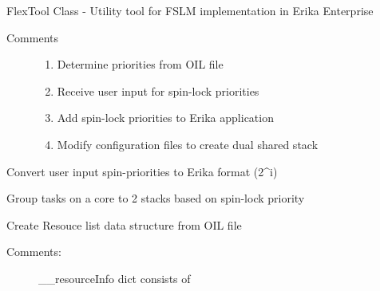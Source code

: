\documentclass[letterpaper,10pt,english]{sphinxmanual}
\begin{document}
\begin{fulllineitems}
\label{\detokenize{code:FlexTool.FlexTool}}
FlexTool Class - Utility tool for FSLM implementation in Erika Enterprise
\begin{description}
\item[{Comments}] \leavevmode{[}{]}\begin{enumerate}
\item {} 
Determine priorities from OIL file

\item {} 
Receive user input for spin-lock priorities

\item {} 
Add spin-lock priorities to Erika application

\item {} 
Modify configuration files to create dual shared stack

\end{enumerate}

\end{description}

\begin{fulllineitems}
\label{\detokenize{code:FlexTool.FlexTool._FlexTool__calculateSpinPriorities}}
Convert user input spin-priorities to Erika format (2\textasciicircum{}i)

\end{fulllineitems}


\begin{fulllineitems}
\label{\detokenize{code:FlexTool.FlexTool._FlexTool__calculateStackAllocation}}
Group tasks on a core to 2 stacks based on spin-lock priority

\end{fulllineitems}


\begin{fulllineitems}
\label{\detokenize{code:FlexTool.FlexTool._FlexTool__createResourceList}}
Create Resouce list data structure from OIL file
\begin{description}
\item[{Comments:}] \leavevmode
\_\_resourceInfo dict consists of


\end{description}
\end{fulllineitems}
\end{fulllineitems}
\end{document}
